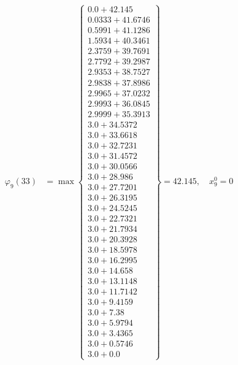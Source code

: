 \documentclass{article}
\begin{document}
\begin{align*}
  
\varphi_{9}(33) &= \max \left\{ \begin{array}{c}
0.0 + 42.145 \\
 0.0333 + 41.6746 \\
 0.5991 + 41.1286 \\
 1.5934 + 40.3461 \\
 2.3759 + 39.7691 \\
 2.7792 + 39.2987 \\
 2.9353 + 38.7527 \\
 2.9838 + 37.8986 \\
 2.9965 + 37.0232 \\
 2.9993 + 36.0845 \\
 2.9999 + 35.3913 \\
 3.0 + 34.5372 \\
 3.0 + 33.6618 \\
 3.0 + 32.7231 \\
 3.0 + 31.4572 \\
 3.0 + 30.0566 \\
 3.0 + 28.986 \\
 3.0 + 27.7201 \\
 3.0 + 26.3195 \\
 3.0 + 24.5245 \\
 3.0 + 22.7321 \\
 3.0 + 21.7934 \\
 3.0 + 20.3928 \\
 3.0 + 18.5978 \\
 3.0 + 16.2995 \\
 3.0 + 14.658 \\
 3.0 + 13.1148 \\
 3.0 + 11.7142 \\
 3.0 + 9.4159 \\
 3.0 + 7.38 \\
 3.0 + 5.9794 \\
 3.0 + 3.4365 \\
 3.0 + 0.5746 \\
 3.0 + 0.0
\end{array} \right\}=42.145,\quad x_{9}^0=0\\
  
  
  

\end{align*}
\end{document}
